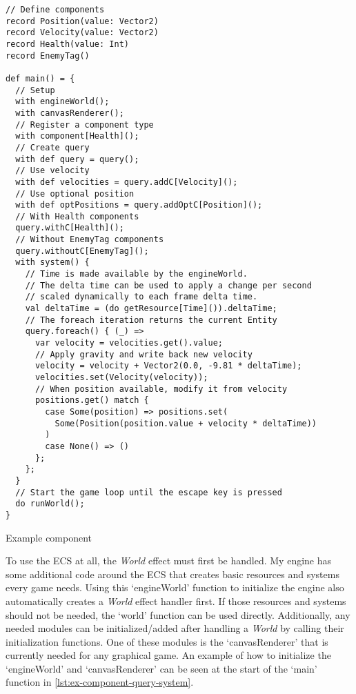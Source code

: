 \begin{listing}
\begin{lstlisting}
// Define components
record Position(value: Vector2)
record Velocity(value: Vector2)
record Health(value: Int)
record EnemyTag()

def main() = {
  // Setup
  with engineWorld();
  with canvasRenderer();
  // Register a component type
  with component[Health]();
  // Create query
  with def query = query();
  // Use velocity
  with def velocities = query.addC[Velocity]();
  // Use optional position
  with def optPositions = query.addOptC[Position]();
  // With Health components
  query.withC[Health]();
  // Without EnemyTag components
  query.withoutC[EnemyTag]();
  with system() {
    // Time is made available by the engineWorld.
    // The delta time can be used to apply a change per second
    // scaled dynamically to each frame delta time.
    val deltaTime = (do getResource[Time]()).deltaTime;
    // The foreach iteration returns the current Entity
    query.foreach() { (_) =>
      var velocity = velocities.get().value;
      // Apply gravity and write back new velocity
      velocity = velocity + Vector2(0.0, -9.81 * deltaTime);
      velocities.set(Velocity(velocity));
      // When position available, modify it from velocity
      positions.get() match {
        case Some(position) => positions.set(
          Some(Position(position.value + velocity * deltaTime))
        )
        case None() => ()
      };
    };
  }
  // Start the game loop until the escape key is pressed
  do runWorld();
}
\end{lstlisting}
\caption{Example component}
\label{lst:ex-component-query-system}
\end{listing}

To use the ECS at all, the \textit{World} effect must first be handled. My engine has some additional code around the ECS that creates basic resources and systems every game needs. Using this `engineWorld' function to initialize the engine also automatically creates a \textit{World} effect handler first. If those resources and systems should not be needed, the `world' function can be used directly. Additionally, any needed modules can be initialized/added after handling a \textit{World} by calling their initialization functions. One of these modules is the `canvasRenderer' that is currently needed for any graphical game. An example of how to initialize the `engineWorld' and `canvasRenderer' can be seen at the start of the `main' function in \cref{lst:ex-component-query-system}.

